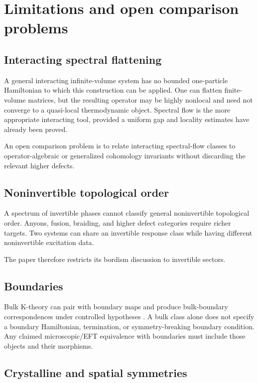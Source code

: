 \documentclass[12pt]{article}
\theoremstyle{definition}
\theoremstyle{remark}
\begin{document}
\section{Limitations and open comparison problems}

\subsection{Interacting spectral flattening}

A general interacting infinite-volume system has no bounded one-particle
Hamiltonian to which this construction can be applied.
One can flatten finite-volume matrices, but the resulting operator may be
highly nonlocal and need not converge to a quasi-local thermodynamic object.
Spectral flow is the more appropriate interacting tool, provided a uniform
gap and locality estimates have already been proved.

An open comparison problem is to relate interacting spectral-flow classes to
operator-algebraic or generalized cohomology invariants without discarding
the relevant higher defects.

\subsection{Noninvertible topological order}

A spectrum of invertible phases cannot classify general noninvertible
topological order.
Anyons, fusion, braiding, and higher defect categories require richer targets.
Two systems can share an invertible response class while having different
noninvertible excitation data.

The paper therefore restricts its bordism discussion to invertible sectors.

\subsection{Boundaries}

Bulk K-theory can pair with boundary maps and produce bulk-boundary
correspondences under controlled hypotheses
\cite{ProdanSchulzBaldes2016,TeoKane2010}.
A bulk class alone does not specify a boundary Hamiltonian, termination, or
symmetry-breaking boundary condition.
Any claimed microscopic/EFT equivalence with boundaries must include those
objects and their morphisms.

\subsection{Crystalline and spatial symmetries}
\end{document}
